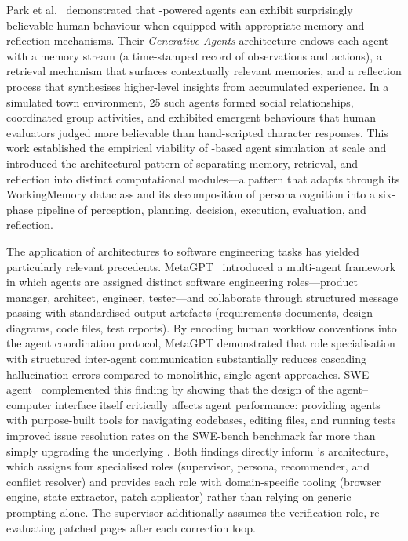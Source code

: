 Park et al.~\cite{park2023generative} demonstrated that -powered agents can exhibit surprisingly believable human behaviour when equipped with appropriate memory and reflection mechanisms. Their \textit{Generative Agents} architecture endows each agent with a memory stream (a time-stamped record of observations and actions), a retrieval mechanism that surfaces contextually relevant memories, and a reflection process that synthesises higher-level insights from accumulated experience. In a simulated town environment, 25 such agents formed social relationships, coordinated group activities, and exhibited emergent behaviours that human evaluators judged more believable than hand-scripted character responses. This work established the empirical viability of -based agent simulation at scale and introduced the architectural pattern of separating memory, retrieval, and reflection into distinct computational modules---a pattern that \versimux{} adapts through its WorkingMemory dataclass and its decomposition of persona cognition into a six-phase pipeline of perception, planning, decision, execution, evaluation, and reflection.

The application of  architectures to software engineering tasks has yielded particularly relevant precedents. MetaGPT~\cite{metagpt} introduced a multi-agent framework in which  agents are assigned distinct software engineering roles---product manager, architect, engineer, tester---and collaborate through structured message passing with standardised output artefacts (requirements documents, design diagrams, code files, test reports). By encoding human workflow conventions into the agent coordination protocol, MetaGPT demonstrated that role specialisation with structured inter-agent communication substantially reduces cascading hallucination errors compared to monolithic, single-agent approaches. SWE-agent~\cite{sweagent} complemented this finding by showing that the design of the agent--computer interface itself critically affects agent performance: providing agents with purpose-built tools for navigating codebases, editing files, and running tests improved issue resolution rates on the SWE-bench benchmark far more than simply upgrading the underlying . Both findings directly inform \versimux{}'s architecture, which assigns four specialised roles (supervisor, persona, recommender, and conflict resolver) and provides each role with domain-specific tooling (browser engine,  state extractor, patch applicator) rather than relying on generic  prompting alone. The supervisor additionally assumes the verification role, re-evaluating patched pages after each correction loop.

